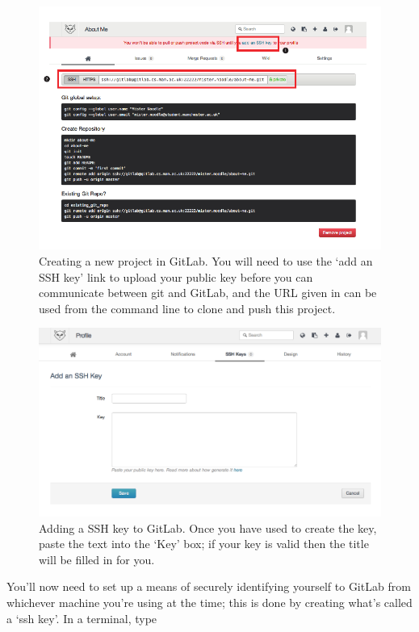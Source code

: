 \begin{figure}
\centerline{\includegraphics[width=15cm]{images/GitLab-new-project}}
\caption{Creating a new project in GitLab. \protect{} You will need to use the  `add an SSH key' link to upload your public key before you can communicate between git and GitLab, and the URL given in \protect{} can be used from the command line to clone and push this project.}\label{figure:GitLab-new-project}
\end{figure}

\begin{figure}
\centerline{\includegraphics[width=13cm]{images/GitLab-ssh}}
\caption{Adding a SSH key to GitLab. Once you have used  to create the key, paste the text into the `Key' box; if your key is valid then the title will be filled in for you.}\label{figure:GitLab-ssh}
\end{figure}

You'll now need to set up a means of securely identifying yourself to GitLab from whichever machine you're using at the time; this is done by creating what's called a `ssh key'. In a terminal, type

